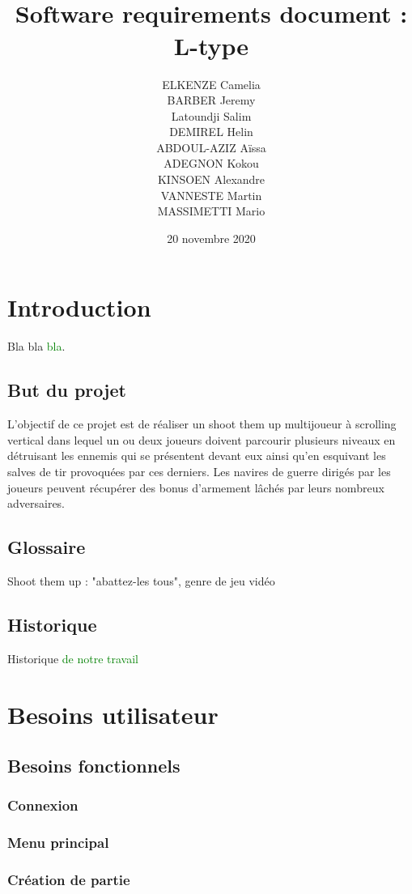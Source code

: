\documentclass[utf8]{article}
\title{\\[3 cm]\Huge Software requirements document : \\[1 cm] L-type\\[7 cm]}
\author{ELKENZE Camelia\\[0,2 cm] BARBER Jeremy\\[0,2 cm] Latoundji Salim\\[0,2 cm] DEMIREL Helin\\[0,2 cm] ABDOUL-AZIZ Aïssa\\[0,2 cm] ADEGNON Kokou\\[0,2 cm] KINSOEN Alexandre\\[0,2 cm] VANNESTE Martin\\[0,2 cm] MASSIMETTI Mario  }
\date{20 novembre 2020}
\renewcommand*{\emph}[1]{\textcolor{green}{#1}}
\begin{document}
\maketitle
\tableofcontents

\newpage


\section{Introduction}
Bla bla \emph{bla}.

\subsection{But du projet}
L’objectif de ce projet est de réaliser un shoot them up multijoueur à scrolling vertical dans lequel un ou deux joueurs doivent parcourir plusieurs niveaux en détruisant les ennemis qui se présentent devant eux ainsi qu’en esquivant les salves de tir provoquées par ces derniers.
Les navires de guerre dirigés par les joueurs peuvent récupérer des bonus d’armement lâchés par leurs nombreux adversaires.

\subsection{Glossaire}
Shoot them up : "abattez-les tous", genre de jeu vidéo

\subsection{Historique}
Historique \emph{de notre travail}

\section{Besoins utilisateur}
\subsection{Besoins fonctionnels}
\subsubsection{Connexion}
\subsubsection{Menu principal}
\subsubsection{Création de partie}
\end{document}
